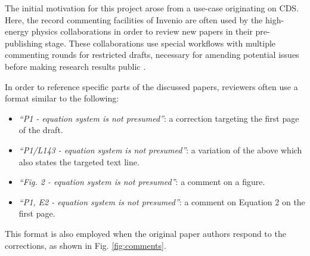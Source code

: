 
The initial motivation for this project arose from a use-case originating on
CDS.  Here, the record commenting facilities of Invenio are often used by the
high-energy physics collaborations in order to review new papers in their
pre-publishing stage.  These collaborations use special workflows with multiple
commenting rounds for restricted drafts, necessary for amending potential
issues before making research results public \cite{ref:ludmila}.

In order to reference specific parts of the discussed papers, reviewers often
use a format similar to the following:
  \begin{itemize}
      \item \textit{``P1 - equation system is not presumed''}: a correction
          targeting the first page of the draft.
      \item \textit{``P1/L143 - equation system is not presumed''}: a variation
        of the above which also states the targeted text line.
      \item \textit{``Fig. 2 - equation system is not presumed''}: a comment on
        a figure.
      \item \textit{``P1, E2 - equation system is not presumed''}: a comment on
        Equation 2 on the first page.
  \end{itemize}
This format is also employed when the original paper authors respond to the
corrections, as shown in Fig. \ref{fig:comments}.

